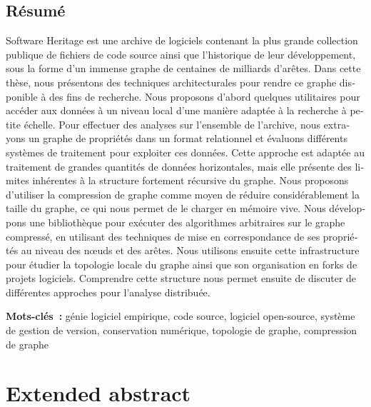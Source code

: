 \begin{otherlanguage}{french}
\section*{Résumé}
\begin{SingleSpace}

Software Heritage est une archive de logiciels contenant la plus
grande collection publique de fichiers de code source ainsi que l'historique de
leur développement, sous la forme d'un immense graphe de centaines de milliards
d'arêtes. Dans cette thèse, nous présentons des techniques architecturales pour
rendre ce graphe disponible à des fins de recherche. Nous proposons d'abord
quelques utilitaires pour accéder aux données à un niveau local d'une manière
adaptée à la recherche à petite échelle. Pour effectuer des analyses sur
l'ensemble de l'archive, nous extrayons un graphe de propriétés dans un format
relationnel et évaluons différents systèmes de traitement pour exploiter ces
données. Cette approche est adaptée au traitement de grandes quantités de
données horizontales, mais elle présente des limites inhérentes à la structure
fortement récursive du graphe. Nous proposons d'utiliser la compression de
graphe comme moyen de réduire considérablement la taille du graphe, ce qui nous
permet de le charger en mémoire vive. Nous développons une bibliothèque pour
exécuter des algorithmes arbitraires sur le graphe compressé, en utilisant
des techniques de mise en correspondance de ses propriétés au
niveau des nœuds et des arêtes. Nous utilisons ensuite cette infrastructure
pour étudier la topologie locale du graphe ainsi que son organisation en forks
de projets logiciels. Comprendre cette structure nous permet ensuite de
discuter de différentes approches pour l'analyse distribuée.

\medskip

\textbf{Mots-clés~:} génie logiciel empirique, code source, logiciel
open-source, système de gestion de version, conservation numérique, topologie
de graphe, compression de graphe

\end{SingleSpace}
\end{otherlanguage}

\clearpage

\chapter*{Extended abstract}

